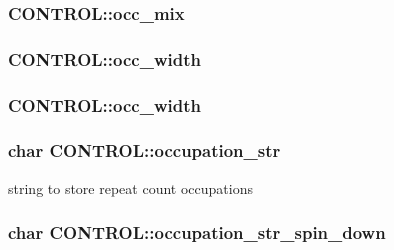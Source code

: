 \hypertarget{struct_c_o_n_t_r_o_l_ab124137468332adffba3d6648bb80b7d}{
\subsubsection[{occ\-\_\-mix}]{ C\-O\-N\-T\-R\-O\-L\-::occ\-\_\-mix}}\label{struct_c_o_n_t_r_o_l_ab124137468332adffba3d6648bb80b7d}
\hypertarget{struct_c_o_n_t_r_o_l_a094b4573bb13b6174f0bc5dd58b0316d}{
\subsubsection[{occ\-\_\-width}]{ C\-O\-N\-T\-R\-O\-L\-::occ\-\_\-width}}\label{struct_c_o_n_t_r_o_l_a094b4573bb13b6174f0bc5dd58b0316d}
\hypertarget{struct_c_o_n_t_r_o_l_a2eb9cec11bfd216c5a044d34b74409c6}{
\subsubsection[{occ\-\_\-width}]{ C\-O\-N\-T\-R\-O\-L\-::occ\-\_\-width}}\label{struct_c_o_n_t_r_o_l_a2eb9cec11bfd216c5a044d34b74409c6}
\hypertarget{struct_c_o_n_t_r_o_l_a20005f8e37d21588823aae37905b0a65}{
\subsubsection[{occupation\-\_\-str}]{\setlength{\rightskip}{0pt plus 5cm}char C\-O\-N\-T\-R\-O\-L\-::occupation\-\_\-str}}\label{struct_c_o_n_t_r_o_l_a20005f8e37d21588823aae37905b0a65}
string to store repeat count occupations \hypertarget{struct_c_o_n_t_r_o_l_a109cd692994e69b902029d1786c6379e}{
\subsubsection[{occupation\-\_\-str\-\_\-spin\-\_\-down}]{\setlength{\rightskip}{0pt plus 5cm}char C\-O\-N\-T\-R\-O\-L\-::occupation\-\_\-str\-\_\-spin\-\_\-down}}\label{struct_c_o_n_t_r_o_l_a109cd692994e69b902029d1786c6379e}
